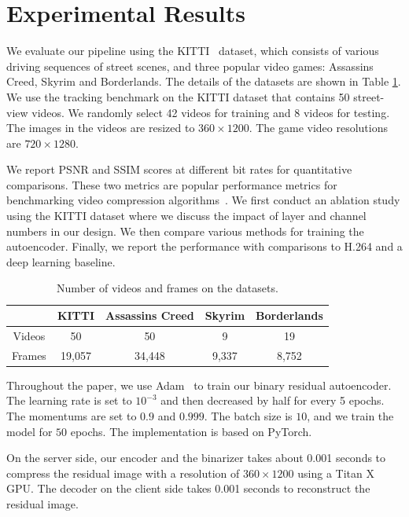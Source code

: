 \documentclass[letterpaper]{article} %
\begin{document}
\section{Experimental Results}

We evaluate our pipeline using the KITTI~\cite{Geiger_CVPR_2012} dataset, which consists of various driving sequences of street scenes, and three popular video games: Assassins Creed, Skyrim and Borderlands. The details of the datasets are shown in Table \ref{tab:dataset}. We use the tracking benchmark on the KITTI dataset that contains 50 street-view videos. We randomly select 42 videos for training and 8 videos for testing. The images in the videos are resized to $360 \times 1200$. The game video resolutions are $720 \times 1280$.

We report PSNR and SSIM scores at different bit rates for quantitative comparisons. These two metrics are popular performance metrics for benchmarking video compression algorithms~\cite{Wang_TIP_2004}. We first conduct an ablation study using the KITTI dataset where we discuss the impact of layer and channel numbers in our design. We then compare various methods for training the autoencoder. Finally, we report the performance with comparisons to H.264 and a deep learning baseline.
\begin{table}[t]
\caption{Number of videos and frames on the datasets.
}
\small
\centering
\begin{tabular}{ccccc}
\toprule
& KITTI & Assassins Creed & Skyrim & Borderlands \\
\hline

Videos & 50 & 50 & 9 & 19 \\
\hline

Frames & 19,057 & 34,448 & 9,337 & 8,752\\
\bottomrule
\end{tabular}
\label{tab:dataset}
\end{table}
{} Throughout the paper, we use Adam~\cite{Kingma_ICLR_2015} to train our binary residual autoencoder. The learning rate is set to $10^{-3}$ and then decreased by half for every 5 epochs. The momentums are set to $0.9$ and $0.999$. The batch size is $10$, and we train the model for $50$ epochs. The implementation is based on PyTorch.

{} On the server side, our encoder and the binarizer takes about 0.001 seconds to compress the residual image with a resolution of $360 \times 1200$ using a Titan X GPU. The decoder on the client side takes 0.001 seconds to reconstruct the residual image. %
\end{document}

